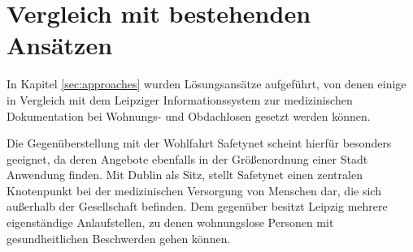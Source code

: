 \section{Vergleich mit bestehenden Ansätzen}

In Kapitel \ref{sec:approaches} wurden Lösungsansätze aufgeführt, von denen einige in Vergleich mit dem Leipziger Informationssystem zur medizinischen Dokumentation bei Wohnungs- und Obdachlosen gesetzt werden können.

Die Gegenüberstellung mit der Wohlfahrt Safetynet scheint hierfür besonders geeignet, da deren Angebote ebenfalls in der Größenordnung einer Stadt Anwendung finden. Mit Dublin als Sitz, stellt Safetynet einen zentralen Knotenpunkt bei der medizinischen Versorgung von Menschen dar, die sich außerhalb der Gesellschaft befinden. Dem gegenüber besitzt Leipzig mehrere eigenständige Anlaufstellen, zu denen wohnungslose Personen mit gesundheitlichen Beschwerden gehen können.

